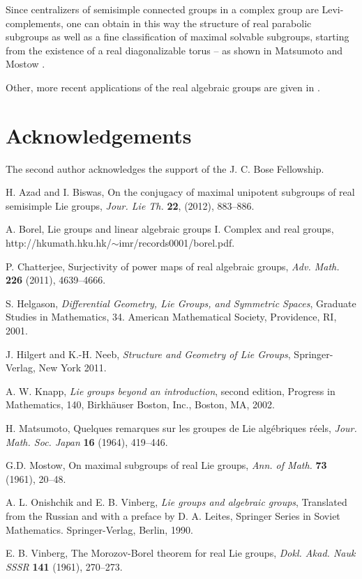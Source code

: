 \documentclass[12pt]{amsart}
\begin{document}
Since centralizers of semisimple connected groups in a complex group are
Levi-complements, one can obtain in this way the structure of real parabolic
subgroups as well as a fine classification of maximal solvable subgroups,
starting from the existence of a real diagonalizable torus -- as shown in
Matsumoto \cite{Ma} and Mostow \cite{Mo}.

Other, more recent applications of the real algebraic groups are given in
\cite{Ch}.

\section*{Acknowledgements}

The second author acknowledges the support of the J. C. Bose Fellowship.


\begin{thebibliography}{AB}
 H. Azad and I. Biswas, On the conjugacy of maximal
unipotent subgroups of real semisimple Lie groups, \textit{Jour. Lie Th.}
\textbf{22}, (2012), 883--886.

 A. Borel, Lie groups and linear algebraic groups I. Complex
and real groups, http://hkumath.hku.hk/$\sim$imr/records0001/borel.pdf.

 P. Chatterjee, Surjectivity of power maps of real algebraic
groups, \textit{Adv. Math.} \textbf{226} (2011), 4639--4666.

 S. Helgason, \textit{Differential Geometry, Lie Groups, and
Symmetric Spaces}, Graduate Studies in Mathematics, 34. American
Mathematical Society, Providence, RI, 2001.

 J. Hilgert and K.-H. Neeb, \textit{Structure and Geometry of
Lie Groups}, Springer-Verlag, New York 2011.

 A. W. Knapp, \textit{Lie groups beyond an introduction},
second edition, Progress in Mathematics, 140, Birkh\"auser Boston, Inc.,
Boston, MA, 2002.

 H. Matsumoto, Quelques remarques sur les groupes de Lie
alg\'ebriques r\'eels, \textit{Jour. Math. Soc. Japan} \textbf{16} (1964),
419--446.

 G.D. Mostow, On maximal subgroups of real Lie groups,
\textit{Ann. of Math.} \textbf{73} (1961), 20--48.

 A. L. Onishchik and E. B. Vinberg, \textit{Lie groups and
algebraic groups}, Translated from the Russian and with a preface by D. A.
Leites, Springer Series in Soviet Mathematics. Springer-Verlag, Berlin, 1990.

 E. B. Vinberg, The Morozov-Borel theorem for real Lie
groups, \textit{Dokl. Akad. Nauk SSSR} \textbf{141} (1961), 270--273.
\end{thebibliography}
\end{document}
